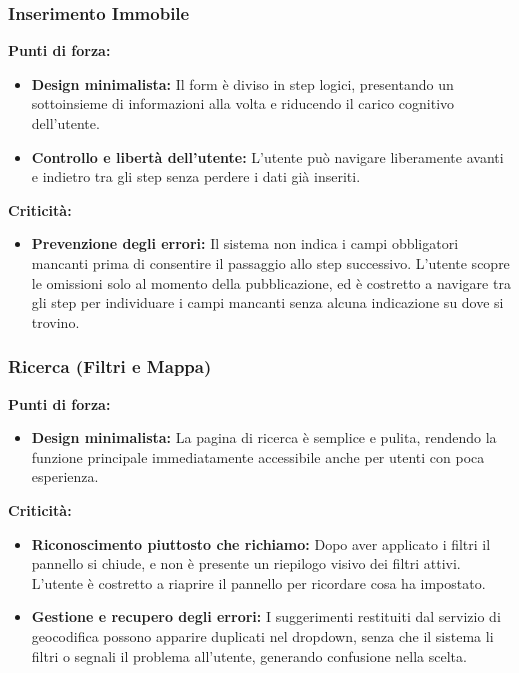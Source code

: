 \documentclass{article}
\begin{document}
\subsubsection*{Inserimento Immobile}

\textbf{Punti di forza:}
\begin{itemize}
    \item \textbf{Design minimalista:} Il form è diviso in step logici, presentando un sottoinsieme di informazioni alla volta e riducendo il carico cognitivo dell'utente.
    \item \textbf{Controllo e libertà dell'utente:} L'utente può navigare liberamente avanti e indietro tra gli step senza perdere i dati già inseriti.
\end{itemize}

\textbf{Criticità:}
\begin{itemize}
    \item \textbf{Prevenzione degli errori:} Il sistema non indica i campi obbligatori mancanti prima di consentire il passaggio allo step successivo. L'utente scopre le omissioni solo al momento della pubblicazione, ed è costretto a navigare tra gli step per individuare i campi mancanti senza alcuna indicazione su dove si trovino.
\end{itemize}

\subsubsection*{Ricerca (Filtri e Mappa)}

\textbf{Punti di forza:}
\begin{itemize}
    \item \textbf{Design minimalista:} La pagina di ricerca è semplice e pulita, rendendo la funzione principale immediatamente accessibile anche per utenti con poca esperienza.
\end{itemize}

\textbf{Criticità:}
\begin{itemize}
    \item \textbf{Riconoscimento piuttosto che richiamo:} Dopo aver applicato i filtri il pannello si chiude, e non è presente un riepilogo visivo dei filtri attivi. L'utente è costretto a riaprire il pannello per ricordare cosa ha impostato.
    \item \textbf{Gestione e recupero degli errori:} I suggerimenti restituiti dal servizio di geocodifica possono apparire duplicati nel dropdown, senza che il sistema li filtri o segnali il problema all'utente, generando confusione nella scelta.
\end{itemize}
\end{document}
